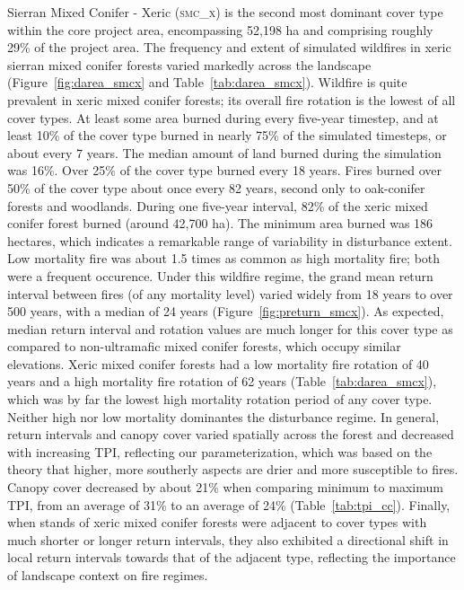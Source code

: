 Sierran Mixed Conifer - Xeric (\textsc{smc\_x}) is the second most dominant cover type within the core project area, encompassing 52,198 ha and comprising roughly 29\% of the project area. The frequency and extent of simulated wildfires in xeric sierran mixed conifer forests varied markedly across the landscape (Figure~\ref{fig:darea_smcx} and Table~\ref{tab:darea_smcx}).  %
%
Wildfire is quite prevalent in xeric mixed conifer forests; its overall fire rotation is the lowest of all cover types. At least some area burned during every five-year timestep, and at least 10\% of the cover type burned in nearly 75\% of the simulated timesteps, or about every 7 years. The median amount of land burned during the simulation was 16\%. Over 25\% of the cover type burned every 18 years. Fires burned over 50\% of the cover type about once every 82 years, second only to oak-conifer forests and woodlands. During one five-year interval, 82\% of the xeric mixed conifer forest burned (around 42,700 ha). The minimum area burned was 186 hectares, which indicates a remarkable range of variability in disturbance extent. Low mortality fire was about 1.5 times as common as high mortality fire; both were a frequent occurence. %
%
Under this wildfire regime, the grand mean return interval between fires (of any mortality level) varied widely from 18 years to over 500 years, with a median of 24 years (Figure~\ref{fig:preturn_smcx}). As expected, median return interval and rotation values are much longer for this cover type as compared to non-ultramafic mixed conifer forests, which occupy similar elevations. Xeric mixed conifer forests had a low mortality fire rotation of 40 years and a high mortality fire rotation of 62 years (Table~\ref{tab:darea_smcx}), which was by far the lowest high mortality rotation period of any cover type. Neither high nor low mortality dominantes the disturbance regime. %
%
In general, return intervals and canopy cover varied spatially across the forest and decreased with increasing TPI, reflecting our parameterization, which was based on the theory that higher, more southerly aspects are drier and more susceptible to fires. Canopy cover decreased by about 21\% when comparing minimum to maximum TPI, from an average of 31\% to an average of 24\% (Table~\ref{tab:tpi_cc}).  %
%
Finally, when stands of xeric mixed conifer forests were adjacent to cover types with much shorter or longer return intervals, they also exhibited a directional shift in local return intervals towards that of the adjacent type, reflecting the importance of landscape context on fire regimes.


